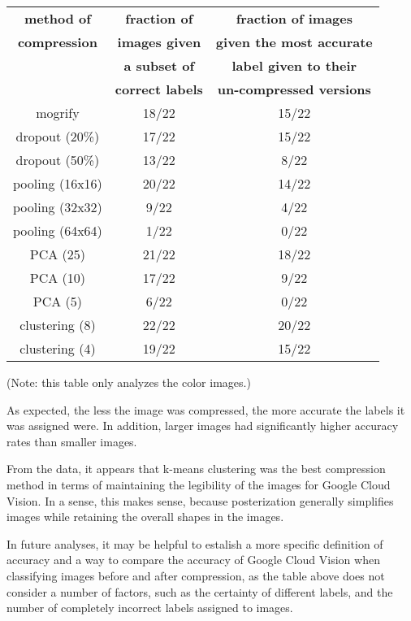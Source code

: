 \documentclass[letterpaper, 10 pt, conference]{ieeeconf}  %
\begin{document}
\begin{tabular}{|c|c|c|}
\hline
{\bf method of} & {\bf fraction of} & 
	{\bf fraction of images} \\
{\bf compression} & {\bf images given} & {\bf given the most accurate} \\
{} & {\bf a subset of} & {\bf label given to their} \\
{} & {\bf correct labels} & {\bf un-compressed versions} \\
\hline
mogrify & 18/22 & 15/22 \\
\hline
dropout (20\%) & 17/22 & 15/22 \\
\hline
dropout (50\%) & 13/22 & 8/22 \\
\hline
pooling (16x16) & 20/22 & 14/22 \\
\hline
pooling (32x32) & 9/22 & 4/22 \\
\hline
pooling (64x64) & 1/22 & 0/22 \\
\hline
PCA (25) & 21/22 & 18/22 \\
\hline
PCA (10) & 17/22 & 9/22 \\
\hline
PCA (5) & 6/22 & 0/22 \\
\hline
clustering (8) & 22/22 & 20/22 \\
\hline
clustering (4) & 19/22 & 15/22 \\
\hline
\end{tabular}

\vspace*{2mm}
(Note: this table only analyzes the color images.)
\vspace*{2mm}

As expected, the less the image was compressed, the more accurate
the labels it was assigned were. In addition, larger images
had significantly higher accuracy rates than smaller images.

From the data, it appears that k-means clustering was
the best compression method in terms of maintaining the legibility
of the images for Google Cloud Vision. In a sense, this makes
sense, because posterization generally simplifies images while
retaining the overall shapes in the images.

In future analyses, it may be helpful to estalish a more
specific definition of accuracy and a way to compare
the accuracy of Google Cloud Vision when classifying
images before and after compression, as the table
above does not consider a number of factors, such as
the certainty of different labels, and the number
of completely incorrect labels assigned to images.
\end{document}
